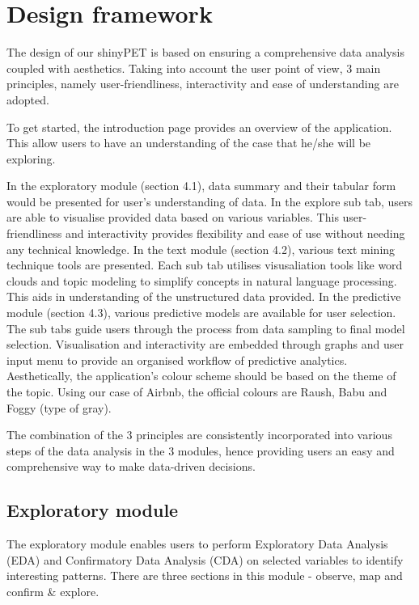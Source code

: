 \documentclass{acm_proc_article-sp}
\begin{document}
\hypertarget{design-framework}{%
\section{Design framework}\label{design-framework}}

The design of our shinyPET is based on ensuring a comprehensive data
analysis coupled with aesthetics. Taking into account the user point of
view, 3 main principles, namely user-friendliness, interactivity and
ease of understanding are adopted.

To get started, the introduction page provides an overview of the
application. This allow users to have an understanding of the case that
he/she will be exploring.

In the exploratory module (section 4.1), data summary and their tabular
form would be presented for user's understanding of data. In the explore
sub tab, users are able to visualise provided data based on various
variables. This user-friendliness and interactivity provides flexibility
and ease of use without needing any technical knowledge. In the text
module (section 4.2), various text mining technique tools are presented.
Each sub tab utilises visusaliation tools like word clouds and topic
modeling to simplify concepts in natural language processing. This aids
in understanding of the unstructured data provided. In the predictive
module (section 4.3), various predictive models are available for user
selection. The sub tabs guide users through the process from data
sampling to final model selection. Visualisation and interactivity are
embedded through graphs and user input menu to provide an organised
workflow of predictive analytics. Aesthetically, the application's
colour scheme should be based on the theme of the topic. Using our case
of Airbnb, the official colours are Raush, Babu and Foggy (type of
gray).

The combination of the 3 principles are consistently incorporated into
various steps of the data analysis in the 3 modules, hence providing
users an easy and comprehensive way to make data-driven decisions.

\hypertarget{exploratory-module}{%
\subsection{Exploratory module}\label{exploratory-module}}

The exploratory module enables users to perform Exploratory Data
Analysis (EDA) and Confirmatory Data Analysis (CDA) on selected
variables to identify interesting patterns. There are three sections in
this module - observe, map and confirm \& explore.
\end{document}

